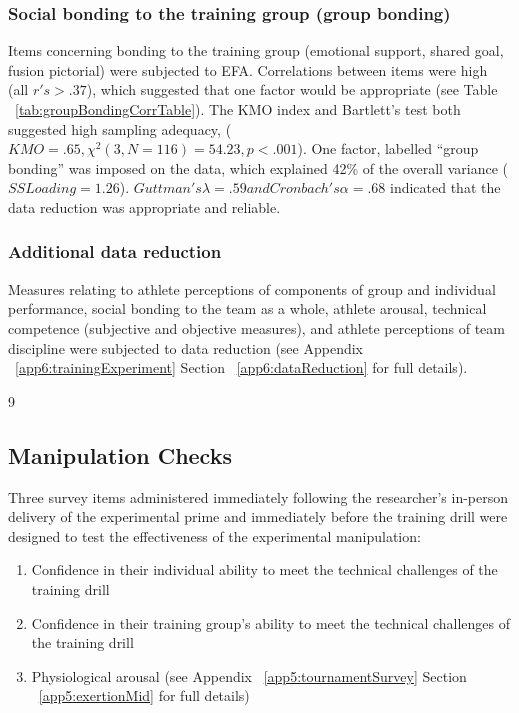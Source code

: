 \subsubsection{Social bonding to the training group (group bonding)}
Items concerning bonding to the training group (emotional support, shared goal, fusion pictorial) were subjected to EFA.  Correlations between items were high (all $r's > .37$), which suggested that one factor would be appropriate (see Table ~\ref{tab:groupBondingCorrTable}). The KMO index and Bartlett's test both suggested high sampling adequacy, ($KMO =  .65, \chi^2(3, N = 116) = 54.23, p < .001$).
One factor, labelled ``group bonding'' was imposed on the data, which explained 42\% of the overall variance ($SS Loading = 1.26$). $Guttman's \lambda = .59 and Cronbach's \alpha = .68$ indicated that the data reduction was appropriate and reliable.

\subsubsection{Additional data reduction}
Measures relating to athlete perceptions of components of group and individual performance, social bonding to the team as a whole, athlete arousal, technical competence (subjective and objective measures), and athlete perceptions of team discipline were subjected to data reduction (see Appendix ~\ref{app6:trainingExperiment} Section ~\ref{app6:dataReduction} for full details).

9
\subsection{Manipulation Checks}
Three survey items administered immediately following the researcher's in-person delivery of the experimental prime and immediately before the training drill were designed to test the effectiveness of the experimental manipulation:

\begin{enumerate}
  \item Confidence in their individual ability to meet the technical challenges of the training drill
  \item Confidence in their training group's ability to meet the technical challenges of the training drill
  \item Physiological arousal (see Appendix ~\ref{app5:tournamentSurvey} Section ~\ref{app5:exertionMid} for full details)
\end{enumerate}

